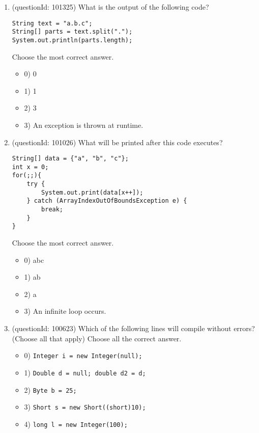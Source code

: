 \documentclass[12pt]{article}
\begin{document}
\begin{enumerate}[label=(\arabic*)]
\begin{itemize}
\end{itemize}
\item (questionId: 101325) What is the output of the following code?
\begin{verbatim}
String text = "a.b.c";
String[] parts = text.split(".");
System.out.println(parts.length);
\end{verbatim}
Choose the most correct answer. 
\begin{itemize}
\item 0) 0

\item 1) 1

\item 2) 3

\item 3) An exception is thrown at runtime.

\end{itemize}
\item (questionId: 101026) What will be printed after this code executes?\n\begin{verbatim}
String[] data = {"a", "b", "c"};
int x = 0;
for(;;){
    try {
        System.out.print(data[x++]);
    } catch (ArrayIndexOutOfBoundsException e) {
        break;
    }
}
\end{verbatim}
Choose the most correct answer. 
\begin{itemize}
\item 0) abc

\item 1) ab

\item 2) a

\item 3) An infinite loop occurs.

\end{itemize}
\item (questionId: 100623) Which of the following lines will compile without errors? (Choose all that apply)
Choose all the correct answer.\begin{itemize}
\item 0) \verb|Integer i = new Integer(null);|

\item 1) \verb|Double d = null; double d2 = d;|

\item 2) \verb|Byte b = 25; |

\item 3) \verb|Short s = new Short((short)10);|

\item 4) \verb|long l = new Integer(100);|


\end{itemize}
\end{enumerate}
\end{document}
